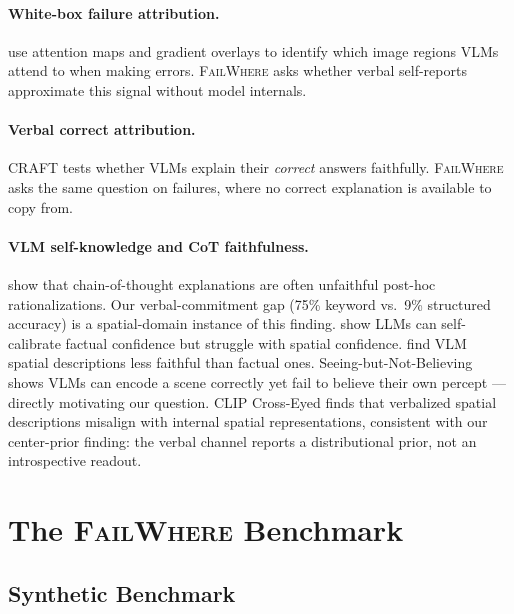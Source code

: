 \documentclass[11pt]{article}
\begin{document}
\paragraph{White-box failure attribution.}
\citet{zhang-2025-mllms} use attention maps and gradient overlays to identify
which image regions VLMs attend to when making errors.
\textsc{FailWhere} asks whether verbal self-reports approximate this signal without
model internals.

\paragraph{Verbal correct attribution.}
CRAFT \citep{parcalabescu-frank-2023-craft} tests whether VLMs explain their
\emph{correct} answers faithfully.
\textsc{FailWhere} asks the same question on failures, where no correct explanation
is available to copy from.

\paragraph{VLM self-knowledge and CoT faithfulness.}
\citet{madsen-etal-2024-faithfulness} show that chain-of-thought explanations are
often unfaithful post-hoc rationalizations.
Our verbal-commitment gap (75\% keyword vs.\ 9\% structured accuracy) is a
spatial-domain instance of this finding.
\citet{kadavath-2022-knowwhat} show LLMs can self-calibrate factual confidence but
struggle with spatial confidence.
\citet{shen-2023-visual-cot} find VLM spatial descriptions less faithful than
factual ones.
Seeing-but-Not-Believing \citep{seeing-2025} shows VLMs can encode a scene
correctly yet fail to believe their own percept — directly motivating our question.
CLIP Cross-Eyed \citep{clipcross-2026} finds that verbalized spatial descriptions
misalign with internal spatial representations, consistent with our center-prior
finding: the verbal channel reports a distributional prior, not an introspective readout.


\section{The \textsc{FailWhere} Benchmark}

\subsection{Synthetic Benchmark}
\end{document}
